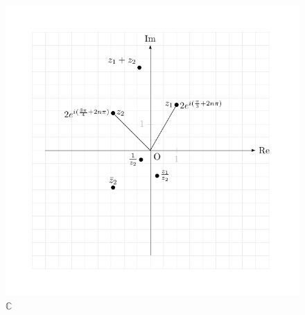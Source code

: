 \documentclass[12pt]{article}
\newcommand{\C}{\mathbb{C}}
\begin{document}
\color{cyan}
\begin{figure}[!htbp]
    \centering
    \includegraphics[width=1 \linewidth]{test1.pdf}
    \caption{$\C$}
\end{figure}
\end{document}
